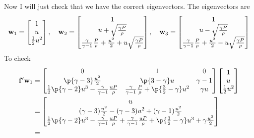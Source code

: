 \documentclass[11pt, oneside]{article}
\begin{document}
\begin{enumerate}
    Now I will just check that we have the correct eigenvectors.
    The eigenvectors are
    \[
      \mathbf{w}_1 =
      \begin{bmatrix}
        1 \\
        u \\
        \frac{1}{2}u^2
      \end{bmatrix}, \quad
      \mathbf{w}_2 =
      \begin{bmatrix}
        1 \\
        u + \sqrt{\frac{\gamma P}{\rho}} \\
        \frac{\gamma}{\gamma - 1}\frac{P}{\rho} + \frac{u^2}{2} + u\sqrt{\frac{\gamma P}{\rho}} \\
      \end{bmatrix}, \quad
      \mathbf{w}_3 =
      \begin{bmatrix}
        1 \\
        u - \sqrt{\frac{\gamma P}{\rho}} \\
        \frac{\gamma}{\gamma - 1}\frac{P}{\rho} + \frac{u^2}{2} - u\sqrt{\frac{\gamma P}{\rho}} \\
      \end{bmatrix}
    \]
    To check
    \begin{align*}
      \v{f}' \v{w}_1 &= 
      \begin{bmatrix}
        0 & 1 & 0 \\
        \p{\gamma - 3} \frac{u^2}{2} & \p{3 - \gamma}u & \gamma - 1 \\
        \frac{1}{2}\p{\gamma - 2} u^3 - \frac{\gamma}{\gamma - 1}\frac{uP}{\rho} & \frac{\gamma}{\gamma - 1}\frac{P}{\rho} + \p{\frac{3}{2} - \gamma}u^2  & \gamma u
      \end{bmatrix}
      \begin{bmatrix}
        1 \\
        u \\
        \frac{1}{2}u^2
      \end{bmatrix} \\
      &=
      \begin{bmatrix}
        u \\
        (\gamma - 3)\frac{u^2}{2} - (\gamma - 3)u^2 + (\gamma - 1)\frac{u^2}{2} \\
        \frac{1}{2}\p{\gamma - 2} u^3 - \frac{\gamma}{\gamma - 1}\frac{uP}{\rho} + \frac{\gamma}{\gamma - 1}\frac{uP}{\rho} + \p{\frac{3}{2} - \gamma}u^3 + \gamma \frac{u^3}{2}
      \end{bmatrix} \\
      &= 

\end{align*}
\end{enumerate}
\end{document}
